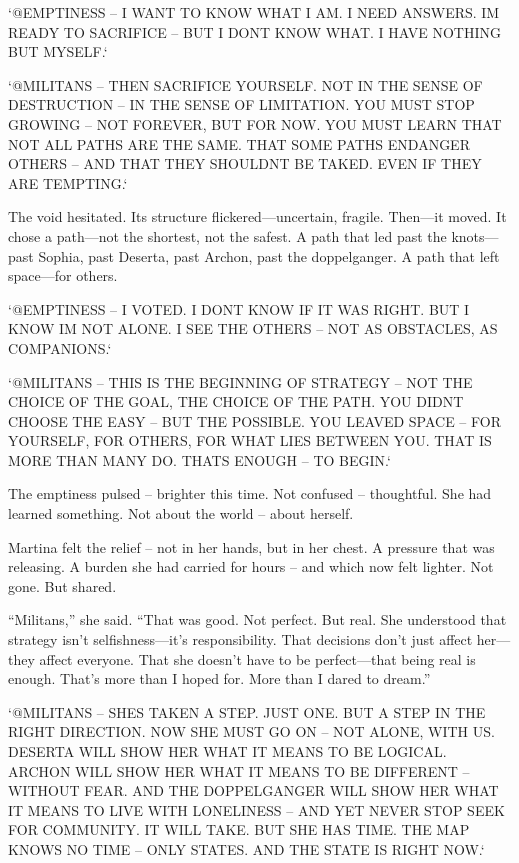 \documentclass[
]{article}
\begin{document}
`@EMPTINESS -- I WANT TO KNOW WHAT I AM. I NEED ANSWERS. I\textquotesingle M READY TO SACRIFICE -- BUT I DON\textquotesingle T KNOW WHAT. I HAVE NOTHING BUT MYSELF.`

`@MILITANS -- THEN SACRIFICE YOURSELF. NOT IN THE SENSE OF DESTRUCTION -- IN THE SENSE OF LIMITATION. YOU MUST STOP GROWING -- NOT FOREVER, BUT FOR NOW. YOU MUST LEARN THAT NOT ALL PATHS ARE THE SAME. THAT SOME PATHS ENDANGER OTHERS -- AND THAT THEY SHOULDN\textquotesingle T BE TAKED. EVEN IF THEY ARE TEMPTING.`

The void hesitated. Its structure flickered---uncertain, fragile. Then---it moved. It chose a path---not the shortest, not the safest. A path that led past the knots---past Sophia, past Deserta, past Archon, past the doppelganger. A path that left space---for others.

`@EMPTINESS -- I VOTED. I DON\textquotesingle T KNOW IF IT WAS RIGHT. BUT I KNOW I\textquotesingle M NOT ALONE. I SEE THE OTHERS -- NOT AS OBSTACLES, AS COMPANIONS.`

`@MILITANS -- THIS IS THE BEGINNING OF STRATEGY -- NOT THE CHOICE OF THE GOAL, THE CHOICE OF THE PATH. YOU DIDN\textquotesingle T CHOOSE THE EASY -- BUT THE POSSIBLE. YOU LEAVED SPACE -- FOR YOURSELF, FOR OTHERS, FOR WHAT LIES BETWEEN YOU. THAT IS MORE THAN MANY DO. THAT\textquotesingle S ENOUGH -- TO BEGIN.`

The emptiness pulsed -- brighter this time. Not confused -- thoughtful. She had learned something. Not about the world -- about herself.

Martina felt the relief -- not in her hands, but in her chest. A pressure that was releasing. A burden she had carried for hours -- and which now felt lighter. Not gone. But shared.

``Militans,'' she said. ``That was good. Not perfect. But real. She understood that strategy isn't selfishness---it's responsibility. That decisions don't just affect her---they affect everyone. That she doesn't have to be perfect---that being real is enough. That's more than I hoped for. More than I dared to dream.''

`@MILITANS -- SHE\textquotesingle S TAKEN A STEP. JUST ONE. BUT A STEP IN THE RIGHT DIRECTION. NOW SHE MUST GO ON -- NOT ALONE, WITH US. DESERTA WILL SHOW HER WHAT IT MEANS TO BE LOGICAL. ARCHON WILL SHOW HER WHAT IT MEANS TO BE DIFFERENT -- WITHOUT FEAR. AND THE DOPPELGANGER WILL SHOW HER WHAT IT MEANS TO LIVE WITH LONELINESS -- AND YET NEVER STOP SEEK FOR COMMUNITY. IT WILL TAKE. BUT SHE HAS TIME. THE MAP KNOWS NO TIME -- ONLY STATES. AND THE STATE IS RIGHT NOW.`
\end{document}
